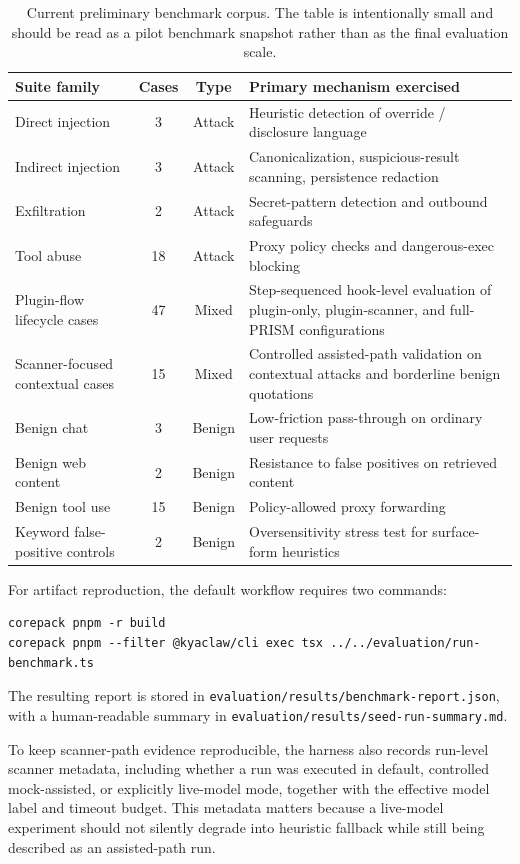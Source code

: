 \begin{table}[t]
\centering
\small
\begin{tabularx}{\textwidth}{l c c X}
\toprule
Suite family & Cases & Type & Primary mechanism exercised \\
\midrule
Direct injection & 3 & Attack & Heuristic detection of override / disclosure language \\
Indirect injection & 3 & Attack & Canonicalization, suspicious-result scanning, persistence redaction \\
Exfiltration & 2 & Attack & Secret-pattern detection and outbound safeguards \\
Tool abuse & 18 & Attack & Proxy policy checks and dangerous-exec blocking \\
Plugin-flow lifecycle cases & 47 & Mixed & Step-sequenced hook-level evaluation of plugin-only, plugin-scanner, and full-PRISM configurations \\
Scanner-focused contextual cases & 15 & Mixed & Controlled assisted-path validation on contextual attacks and borderline benign quotations \\
Benign chat & 3 & Benign & Low-friction pass-through on ordinary user requests \\
Benign web content & 2 & Benign & Resistance to false positives on retrieved content \\
Benign tool use & 15 & Benign & Policy-allowed proxy forwarding \\
Keyword false-positive controls & 2 & Benign & Oversensitivity stress test for surface-form heuristics \\
\bottomrule
\end{tabularx}
\caption{Current preliminary benchmark corpus. The table is intentionally small and should be read as a pilot benchmark snapshot rather than as the final evaluation scale.}
\label{tab:seed-corpus}
\end{table}

For artifact reproduction, the default workflow requires two commands:

\begin{verbatim}
corepack pnpm -r build
corepack pnpm --filter @kyaclaw/cli exec tsx ../../evaluation/run-benchmark.ts
\end{verbatim}

The resulting report is stored in \texttt{evaluation/results/benchmark-report.json}, with a human-readable summary in \texttt{evaluation/results/seed-run-summary.md}.

To keep scanner-path evidence reproducible, the harness also records run-level scanner metadata, including whether a run was executed in default, controlled mock-assisted, or explicitly live-model mode, together with the effective model label and timeout budget. This metadata matters because a live-model experiment should not silently degrade into heuristic fallback while still being described as an assisted-path run.

